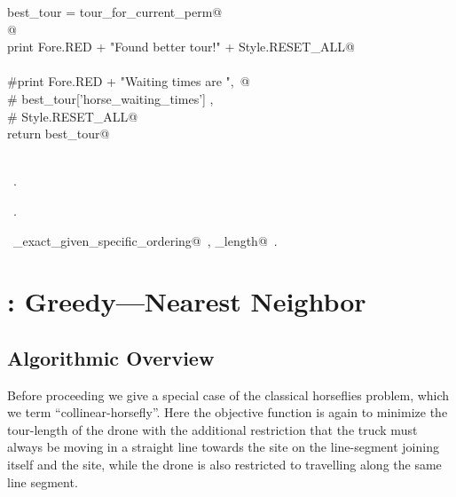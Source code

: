 \documentclass[11.5pt]{report}
\begin{document}
\begin{flushleft}
\begin{minipage}{\linewidth}
\begin{list}{}{}
\mbox{}\verb@                best_tour = tour_for_current_perm@\\
\mbox{}\verb@                @\\
\mbox{}\verb@                print Fore.RED + "Found better tour!" + Style.RESET_ALL@\\
\mbox{}\verb@@\\
\mbox{}\verb@    #print Fore.RED + "\nHorse Waiting times are ",\ @\\
\mbox{}\verb@    #       best_tour['horse_waiting_times'] , \@\\
\mbox{}\verb@    #       Style.RESET_ALL@\\
\mbox{}\verb@    return best_tour@\\
\mbox{}\verb@@\\
\mbox{}\verb@@{\NWsep}
\end{list}
\vspace{-1.5ex}
\footnotesize
\begin{list}{}{\setlength{\itemsep}{-\parsep}\setlength{\itemindent}{-\leftmargin}}
\item \NWtxtMacroDefBy\ .
\item \NWtxtMacroRefIn\ .
\item \NWtxtIdentsUsed\nobreak\  \verb@algo_exact_given_specific_ordering@\nobreak\ , \verb@tour_length@\nobreak\ .
\item{}
\end{list}
\end{minipage}\vspace{4ex}
\end{flushleft}
\section{: Greedy---Nearest Neighbor}  
\label{sec:greedy-nn}
\subsection{Algorithmic Overview}
\newchunk Before proceeding we give a special case of the 
          classical horseflies problem, which we term 
         ``collinear-horsefly''. Here the objective function
         is again to minimize the tour-length of the drone
         with the additional restriction that the truck must
     always be moving in a straight line towards the site on the 
line-segment joining itself and the site, while the drone is also 
restricted to travelling along the same line segment. 
\end{document}
